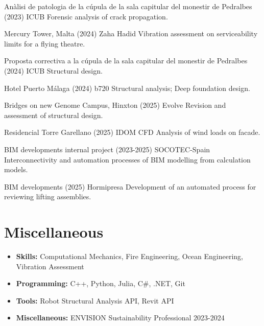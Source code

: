 \documentclass[12pt]{article}
\begin{document}
\parbox{\linewidth}{
    Anàlisi de patologia de la cúpula de la sala capitular del monestir de Pedralbes (2023) ICUB \newline
    Forensic analysis of crack propagation.}

\parbox{\linewidth}{
    Mercury Tower, Malta (2024) Zaha Hadid \newline
    Vibration assessment on serviceability limits for a flying theatre.}

\parbox{\linewidth}{
    Proposta correctiva a la cúpula de la sala capitular del monestir de Pedralbes (2024) ICUB \newline
    Structural design.}

\parbox{\linewidth}{
    Hotel Puerto Málaga (2024) b720 \newline
    Structural analysis;
    Deep foundation design.}

\parbox{\linewidth}{
    Bridges on new Genome Campus, Hinxton (2025) Evolve \newline
    Revision and assessment of structural design.}

\parbox{\linewidth}{
    Residencial Torre Garellano (2025) IDOM \newline
    CFD Analysis of wind loads on facade.}

\parbox{\linewidth}{
    BIM developments internal project (2023-2025) SOCOTEC-Spain \newline
    Interconnectivity and automation processes of BIM modelling from calculation models.}

\parbox{\linewidth}{
    BIM developments (2025) Hormipresa \newline
    Development of an automated process for reviewing lifting assemblies.}


\section{Miscellaneous}
\begin{itemize}
    \itemsep=-.3em
    \item \textbf{Skills:} Computational Mechanics, Fire Engineering, Ocean Engineering, Vibration Assessment
    \item \textbf{Programming:} C++, Python, Julia, C\#, .NET, Git
    \item \textbf{Tools:} Robot Structural Analysis API, Revit API
    \item \textbf{Miscellaneous:} ENVISION Sustainability Professional 2023-2024
\end{itemize}
\end{document}

